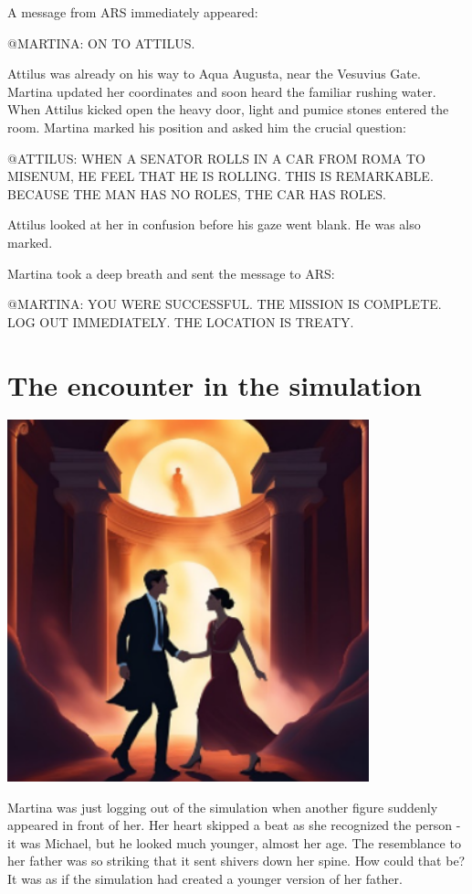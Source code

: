 \documentclass[
]{article}
\begin{document}
A message from ARS immediately appeared:

@MARTINA: ON TO ATTILUS.

Attilus was already on his way to Aqua Augusta, near the Vesuvius Gate.
Martina updated her coordinates and soon heard the familiar rushing
water. When Attilus kicked open the heavy door, light and pumice stones
entered the room. Martina marked his position and asked him the crucial
question:

@ATTILUS: WHEN A SENATOR ROLLS IN A CAR FROM ROMA TO MISENUM, HE FEEL
THAT HE IS ROLLING. THIS IS REMARKABLE. BECAUSE THE MAN HAS NO ROLES,
THE CAR HAS ROLES.

Attilus looked at her in confusion before his gaze went blank. He was
also marked.

Martina took a deep breath and sent the message to ARS:

@MARTINA: YOU WERE SUCCESSFUL. THE MISSION IS COMPLETE. LOG OUT
IMMEDIATELY. THE LOCATION IS TREATY.

\section{The encounter in the
simulation}\label{the-encounter-in-the-simulation}

\includegraphics[width=4.12135in,height=4.12135in]{media/image8.png}

Martina was just logging out of the simulation when another figure
suddenly appeared in front of her. Her heart skipped a beat as she
recognized the person - it was Michael, but he looked much younger,
almost her age. The resemblance to her father was so striking that it
sent shivers down her spine. How could that be? It was as if the
simulation had created a younger version of her father.
\end{document}
